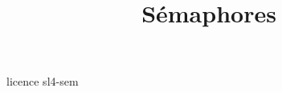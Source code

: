 \documentclass [xcolor=table] {beamer}
\title {Sémaphores}
\begin{document}
 {licence}
 {sl4-sem}
\end{document}
